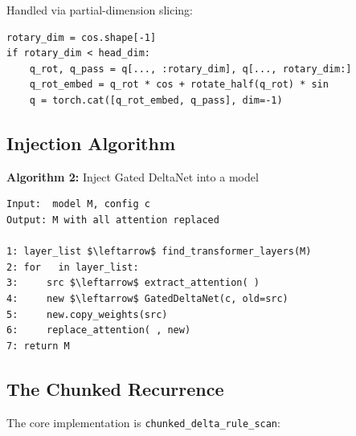 Handled via partial-dimension slicing:

\begin{lstlisting}
rotary_dim = cos.shape[-1]
if rotary_dim < head_dim:
    q_rot, q_pass = q[..., :rotary_dim], q[..., rotary_dim:]
    q_rot_embed = q_rot * cos + rotate_half(q_rot) * sin
    q = torch.cat([q_rot_embed, q_pass], dim=-1)
\end{lstlisting}

\subsection{Injection Algorithm}

\textbf{Algorithm 2:} Inject Gated DeltaNet into a model
\begin{lstlisting}
Input:  model M, config c
Output: M with all attention replaced

1: layer_list $\leftarrow$ find_transformer_layers(M)
2: for   in layer_list:
3:     src $\leftarrow$ extract_attention( )
4:     new $\leftarrow$ GatedDeltaNet(c, old=src)
5:     new.copy_weights(src)
6:     replace_attention( , new)
7: return M
\end{lstlisting}

\subsection{The Chunked Recurrence}

The core implementation is \texttt{chunked\_delta\_rule\_scan}:


